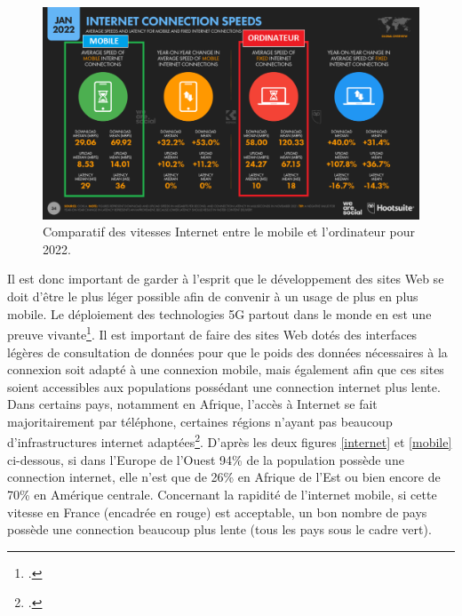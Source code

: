 \documentclass[a4paper,12pt,twoside]{book}
\begin{document}
\begin{figure}[H]
    \centering
    \includegraphics[width=\linewidth]{img/partie_3/speed.png}
    \caption[Comparatif des vitesses Internet entre le mobile et l'ordinateur pour 2022]{Comparatif des vitesses Internet entre le mobile et l'ordinateur pour 2022.\footnotemark}
    \label{speed}
\end{figure}


Il est donc important de garder à l'esprit que le développement des sites Web se doit d'être le plus léger possible afin de convenir à un usage de plus en plus mobile. Le déploiement des technologies 5G partout dans le monde en est une preuve vivante\footcite{cinqg}. Il est important de faire des sites Web dotés des interfaces légères de consultation de données pour que le poids des données nécessaires à la connexion soit adapté à une connexion mobile, mais également afin que ces sites soient accessibles aux populations possédant une connection internet plus lente. Dans certains pays, notamment en Afrique, l'accès à Internet se fait majoritairement par téléphone, certaines régions n'ayant pas beaucoup d'infrastructures internet adaptées\footcite{africa}. D'après les deux figures \ref{internet} et \ref{mobile} ci-dessous, si dans l'Europe de l'Ouest 94\% de la population possède une connection internet, elle n'est que de 26\% en Afrique de l'Est ou bien encore de 70\% en Amérique centrale. Concernant la rapidité de l'internet mobile, si cette vitesse en France (encadrée en rouge) est acceptable, un bon nombre de pays possède une connection beaucoup plus lente (tous les pays sous le cadre vert).
\end{document}
